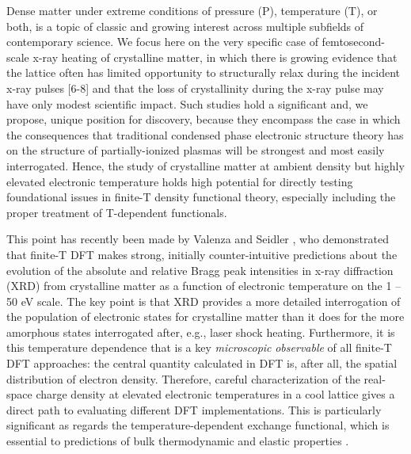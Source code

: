 Dense matter under extreme conditions of pressure (P), temperature (T),
or both, is a topic of classic and growing interest across multiple
subfields of contemporary science. \cite{DRAKE2006HIGH, KRISHNAN1998STRUCTURE, FORTNEY2009FRONTIERS, GLENZER2009X, NATIONAL2003HIGH} We focus here on the very
specific case of femtosecond-scale x-ray heating of crystalline matter,
in which there is growing evidence that the lattice often has limited
opportunity to structurally relax during the incident x-ray pulses
{[}6-8{]} and that the loss of crystallinity during the x-ray pulse may
have only modest scientific impact. \cite{CALEMAN2015ULTRAFAST} Such studies hold a
significant and, we propose, unique position for discovery, because they
encompass the case in which the consequences that traditional condensed
phase electronic structure theory has on the structure of
partially-ionized plasmas will be strongest and most easily
interrogated. Hence, the study of crystalline matter at ambient density
but highly elevated electronic temperature holds high potential for
directly testing foundational issues in finite-T density functional
theory, especially including the proper treatment of T-dependent
functionals. \cite{KARASIEV2012GENERALIZED, KARASIEV2012COMPARISON, VALENZA2016WARM}

This point has recently been made by Valenza and Seidler \cite{VALENZA2016WARM}, who
demonstrated that finite-T DFT makes strong, initially counter-intuitive
predictions about the evolution of the absolute and relative Bragg peak
intensities in x-ray diffraction (XRD) from crystalline matter as a
function of electronic temperature on the 1 -- 50 eV scale. The key
point is that XRD provides a more detailed interrogation of the
population of electronic states for crystalline matter than it does for
the more amorphous states interrogated after, e.g., laser shock heating.
Furthermore, it is this temperature dependence that is a key
\emph{microscopic} \emph{observable} of all finite-T DFT approaches: the
central quantity calculated in DFT is, after all, the spatial
distribution of electron density. Therefore, careful characterization of
the real-space charge density at elevated electronic temperatures in a
cool lattice gives a direct path to evaluating different DFT
implementations. This is particularly significant as regards the
temperature-dependent exchange functional, which is essential to
predictions of bulk thermodynamic and elastic properties \cite{KARASIEV2012GENERALIZED, KARASIEV2012COMPARISON, BREDOW2000EFFECT}.

